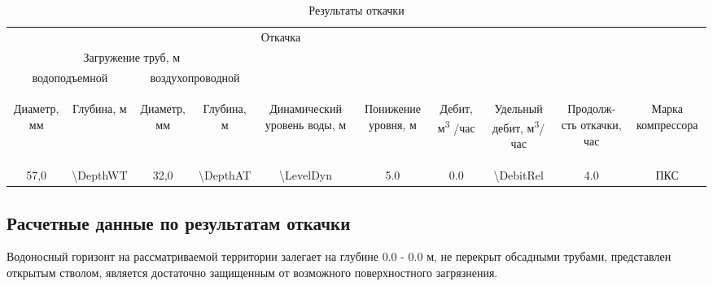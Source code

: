 \documentclass[a4paper,12pt]{article} %
\newcommand{\txtDepth}{0.0}					%
\newcommand{\txtDebit}{0.0}					%
\newcommand{\txtHorizDepth}{0.0}			%
\newcommand{\txtPumpResults}{
57,0 & 		%
\num{\DepthWT} & 		%
32,0 & 		%
\num{\DepthAT}  &		%
\num{\LevelDyn} & 	%
\num{5.0}  &		%
\num{\txtDebit} & %
\num{\DebitRel}  &		%
\num{4.0}  &		%
ПКС			%
}			%
\begin{document}
\begin{table}[!h]
	\caption{Результаты откачки}
	\centering\begin{tabular}{|c|c|c|c|c|c|c|c|c|c|}
	\hline 
	\multicolumn{8}{|c|}{Откачка}&  &  \\ 
	\cline{1-8} 
	\multicolumn{4}{|c|}{Загружение труб, м} &  &  &  &  &  &  \\ 
	\cline{1-4} 
	\multicolumn{2}{|c|}{водоподъемной} & \multicolumn{2}{c|}{воздухопроводной} &  &  &  &  &  & \\ 
	\cline{1-4} 
	\begin{sideways}Диаметр, мм\end{sideways} &
	\begin{sideways}Глубина, м\end{sideways} &
	\begin{sideways}Диаметр, мм\end{sideways} &
	\begin{sideways}Глубина, м\end{sideways} &
	\begin{sideways}Динамический уровень воды, м\end{sideways} &
	\begin{sideways}Понижение уровня, м\end{sideways} &
	\begin{sideways}Дебит, м\textsuperscript{3} /час\end{sideways} &
	\begin{sideways}Удельный дебит, м\textsuperscript{3}/час \end{sideways} &
	\begin{sideways}Продолж-сть откачки, час\end{sideways} &
	\begin{sideways}Марка компрессора\end{sideways} \\ 
	\hline 
	\txtPumpResults \\ 
	\hline 
\end{tabular} 
\end{table}

\subsection{Расчетные данные по результатам откачки}

Водоносный горизонт на рассматриваемой территории залегает на глубине 	{\num{\txtHorizDepth}} - {\num{\txtDepth}}	м, не перекрыт обсадными трубами, представлен открытым стволом, является достаточно защищенным от возможного поверхностного загрязнения.
\end{document}
